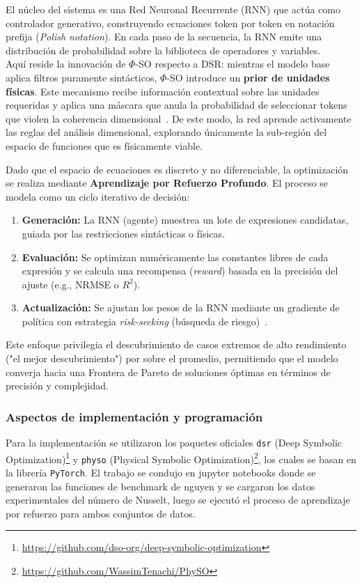 El núcleo del sistema es una Red Neuronal Recurrente (RNN) que actúa como controlador generativo, construyendo ecuaciones token por token en notación prefija (\textit{Polish notation}). En cada paso de la secuencia, la RNN emite una distribución de probabilidad sobre la biblioteca de operadores y variables.\\

Aquí reside la innovación de $\Phi$-SO respecto a DSR: mientras el modelo base aplica filtros puramente sintácticos, $\Phi$-SO introduce un \textbf{prior de unidades físicas}. Este mecanismo recibe información contextual sobre las unidades requeridas y aplica una máscara que anula la probabilidad de seleccionar tokens que violen la coherencia dimensional~\cite{5}. De este modo, la red aprende activamente las reglas del análisis dimensional, explorando únicamente la sub-región del espacio de funciones que es físicamente viable.

Dado que el espacio de ecuaciones es discreto y no diferenciable, la optimización se realiza mediante \textbf{Aprendizaje por Refuerzo Profundo}. El proceso se modela como un ciclo iterativo de decisión:
\begin{enumerate}
    \item \textbf{Generación:} La RNN (agente) muestrea un lote de expresiones candidatas, guiada por las restricciones sintácticas o físicas.
    \item \textbf{Evaluación:} Se optimizan numéricamente las constantes libres de cada expresión y se calcula una recompensa (\textit{reward}) basada en la precisión del ajuste (e.g., NRMSE o $R^2$).
    \item \textbf{Actualización:} Se ajustan los pesos de la RNN mediante un gradiente de política con estrategia \textit{risk-seeking} (búsqueda de riesgo)~\cite{4}.
\end{enumerate}

Este enfoque privilegia el descubrimiento de casos extremos de alto rendimiento ("el mejor descubrimiento") por sobre el promedio, permitiendo que el modelo converja hacia una Frontera de Pareto de soluciones óptimas en términos de precisión y complejidad.

\subsubsection{Aspectos de implementación y programación}

Para la implementación se utilizaron los paquetes oficiales \texttt{dsr} (Deep Symbolic Optimization)\footnote{\url{https://github.com/dso-org/deep-symbolic-optimization}} y \texttt{physo} (Physical Symbolic Optimization)\footnote{\url{https://github.com/WassimTenachi/PhySO}}, los cuales se basan en la librería \texttt{PyTorch}. El trabajo se condujo en jupyter notebooks donde se generaron las funciones de benchmark de nguyen y se cargaron los datos experimentales del número de Nusselt, luego se ejecutó el proceso de aprendizaje por refuerzo para ambos conjuntos de datos.\\


